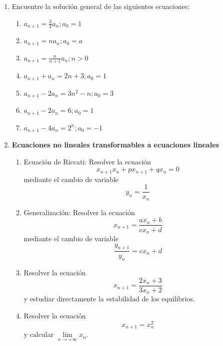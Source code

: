 \documentclass{article}
\begin{document}
\begin{enumerate}
\item Encuentre la soluci\'{o}n general de las siguientes ecuaciones:

\begin{enumerate}
\item $a_{n+1}=\frac{3}{2}a_{n};a_{0}=1$

\item $a_{n+1}=na_{n};a_{0}=a$

\item $a_{n+1}=\frac{n}{n+1}a_{n};n>0$

\item $a_{n+1}+a_{n}=2n+3;a_{0}=1$

\item $a_{n+1}-2a_{n}=3n^{2}-n;a_{0}=3$

\item $a_{n+1}-2a_{n}=6;a_{0}=1$

\item $a_{n+1}-4a_{n}=2^{n};a_{0}=-1$
\end{enumerate}

\item \textbf{Ecuaciones no lineales transformables a ecuaciones lineales}

\begin{enumerate}
\item Ecuaci\'{o}n de Riccati: Resolver la ecuaci\'{o}n%
\begin{equation*}
x_{n+1}x_{n}+px_{n+1}+qx_{n}=0
\end{equation*}%
mediante el cambio de variable%
\begin{equation*}
y_{n}=\frac{1}{x_{n}}
\end{equation*}

\item Generalizaci\'{o}n: Resolver la ecuaci\'{o}n%
\begin{equation*}
x_{n+1}=\frac{ax_{n}+b}{cx_{n}+d}
\end{equation*}%
mediante el cambio de variable%
\begin{equation*}
\frac{y_{n+1}}{y_{n}}=cx_{n}+d
\end{equation*}

\item Resolver la ecuaci\'{o}n%
\begin{equation*}
x_{n+1}=\frac{2x_{n}+3}{3x_{n}+2}
\end{equation*}%
y estudiar directamente la estabilidad de los equilibrios.

\item Resolver la ecuaci\'{o}n%
\begin{equation*}
x_{n+1}=x_{n}^{2}
\end{equation*}%
y calcular $\underset{n\rightarrow +\infty }{\lim }x_{n}$.


\end{enumerate}
\end{enumerate}
\end{document}
